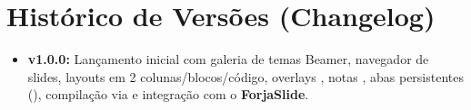 \documentclass[11pt,a4paper]{article}
\begin{document}
\section{Histórico de Versões (Changelog)}
\begin{itemize}
  \item \textbf{v1.0.0:} Lançamento inicial com galeria de temas Beamer, navegador de slides, layouts em 2 colunas/blocos/código, overlays , notas , abas persistentes (), compilação via  e integração com o \textbf{ForjaSlide}.
\end{itemize}
\end{document}
